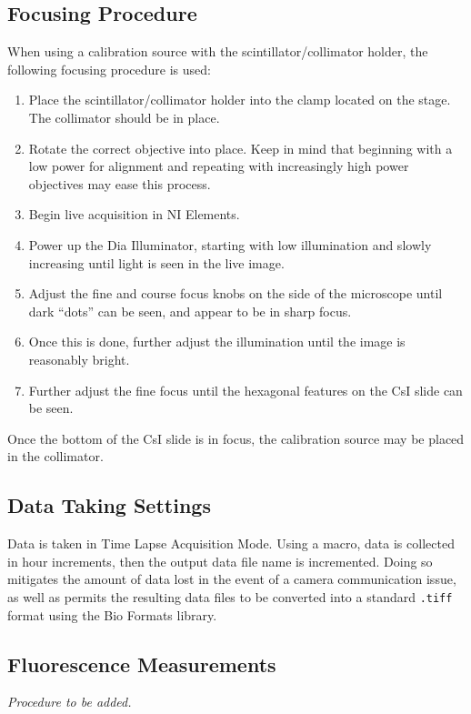 \documentclass[11pt]{article}
\begin{document}
\subsection{Focusing Procedure}
When using a calibration source with the scintillator/collimator holder, the following focusing procedure is used:
\begin{enumerate}
\item Place the scintillator/collimator holder into the clamp located on the stage. The collimator should be in place. 
\item Rotate the correct objective into place. Keep in mind that beginning with a low power for alignment and repeating with increasingly high power objectives may ease this process.
\item Begin live acquisition in NI Elements. 
\item Power up the Dia Illuminator, starting with low illumination and slowly increasing until light is seen in the live image. 
\item Adjust the fine and course focus knobs on the side of the microscope until dark ``dots'' can be seen, and appear to be in sharp focus. 
\item Once this is done, further adjust the illumination until the image is reasonably bright. 
\item Further adjust the fine focus until the hexagonal features on the CsI slide can be seen. 
\end{enumerate}
Once the bottom of the CsI slide is in focus, the calibration source may be placed in the collimator. 
\subsection{Data Taking Settings}
Data is taken in Time Lapse Acquisition Mode. Using a macro, data is collected in hour increments, then the output data file name is incremented. Doing so mitigates the 
amount of data lost in the event of a camera communication issue, as well as permits the resulting data files to be converted into a standard \verb+.tiff+ format using the Bio Formats library. 




\subsection{Fluorescence Measurements}
\emph{Procedure to be added.}
\end{document}
